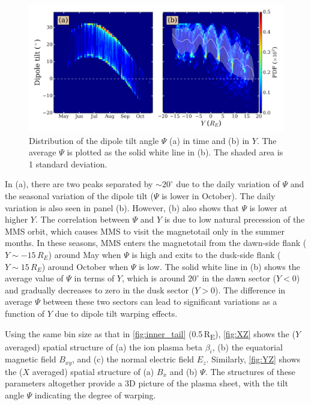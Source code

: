 \documentclass[draft]{agujournal2019}
\begin{document}
\begin{figure}
\centering
\noindent\includegraphics[width=\textwidth]{2023JA031358R-f05.pdf}
\caption{
Distribution of the dipole tilt angle $\Psi$ (a) in time and (b) in $Y$. The average $\Psi$ is plotted as the solid white line in (b). The shaded area is 1 standard deviation.
}
\label{fig:dipole_tilt}
\end{figure}

In (a), there are two peaks separated by $\sim20^\circ$ due to the daily variation of $\Psi$ and the seasonal variation of the dipole tilt ($\Psi$ is lower in October). The daily variation is also seen in panel (b). However, (b) also shows that $\Psi$ is lower at higher $Y$. The correlation between $\Psi$ and $Y$ is due to low natural precession of the MMS orbit, which causes MMS to visit the magnetotail only in the summer months. In these seasons, MMS enters the magnetotail from the dawn-side flank (${Y\sim-15\,\si{R_E}}$) around May when $\Psi$ is high and exits to the dusk-side flank (${Y\sim15\,\si{R_E}}$) around October when $\Psi$ is low. The solid white line in (b) shows the average value of $\Psi$ in terms of $Y$, which is around $20^\circ$ in the dawn sector (${Y<0}$) and gradually decreases to zero in the dusk sector (${Y>0}$). The difference in average $\Psi$ between these two sectors can lead to significant variations as a function of $Y$ due to dipole tilt warping effects.

Using the same bin size as that in \cref{fig:inner_tail} (0.5\,\si{R_E}), \mbox{\cref{fig:XZ}} shows the ($Y$ averaged) spatial structure of (a) the ion plasma beta $\beta_i$, (b) the equatorial magnetic field $B_{xy}$, and (c) the normal electric field $E_z$. Similarly, \mbox{\cref{fig:YZ}} shows the ($X$ averaged) spatial structure of (a) $B_x$ and (b) $\Psi$. The structures of these parameters altogether provide a 3D picture of the plasma sheet, with the tilt angle $\Psi$ indicating the degree of warping.
\end{document}
